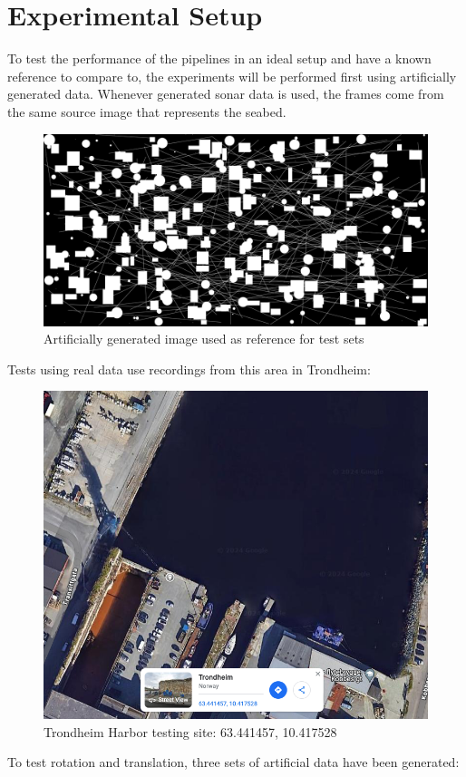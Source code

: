 \chapter{Experimental Setup}
\label{chap:setup}

To test the performance of the pipelines in an ideal setup and have a known reference to compare to, the experiments will be performed first using artificially generated data. Whenever generated sonar data is used, the frames come from the same source image that represents the seabed.

\begin{figure}[H]
  \centering
  \includegraphics[width=.7\textwidth]{figures/setup/test-reference.png}
  \caption[Source image for fake data]{Artificially generated image used as reference for test sets}
  \label{fig:test_reference}
\end{figure}


Tests using real data use recordings from this area in Trondheim:
\begin{figure}[H]
  \centering
  \includegraphics[width=.7\textwidth]{figures/setup/Map.png}
  \caption{Trondheim Harbor testing site: 63.441457, 10.417528}
\end{figure}


To test rotation and translation, three sets of artificial data have been generated:

